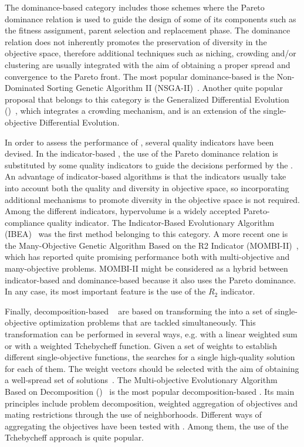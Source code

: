 The dominance-based category includes those schemes where the Pareto dominance relation is used to guide the 
design of some of its components such as the fitness assignment, parent selection and replacement phase.
%
The dominance relation does not inherently promotes the preservation of diversity in the objective space, 
therefore additional techniques such as niching, crowding and/or clustering are usually integrated with the aim of 
obtaining a proper spread and convergence to the Pareto front.
%
The most popular dominance-based \MOEA{} is the Non-Dominated Sorting Genetic Algorithm II (NSGA-II)~\cite{Joel:NSGAII}. 
%
Another quite popular proposal that belongs to this category is the Generalized Differential Evolution (\GDEIII{})~\cite{Joel:GDE3}, 
which integrates a crowding mechanism, and is an extension of the single-objective Differential Evolution.

In order to assess the performance of \MOEAS{}, several quality indicators have been devised.
%
In the indicator-based \MOEAS{}, the use of the Pareto dominance relation is substituted by some quality indicators 
to guide the decisions performed by the \MOEA{}.
%
An advantage of indicator-based algorithms is that the indicators usually take into account both the quality and 
diversity in objective space, so incorporating additional mechanisms to promote diversity in the objective 
space is not required.
%
Among the different indicators, hypervolume is a widely accepted Pareto-compliance quality indicator.
%
The Indicator-Based Evolutionary Algorithm (IBEA)~\cite{Joel:IBEA} was the first method belonging to this category.
%
A more recent one is the Many-Objective Genetic Algorithm Based on the R2 Indicator (MOMBI-II)~\cite{Joel:MOMBI-II}, 
which has reported quite promising performance both with multi-objective and many-objective problems.
%
MOMBI-II might be considered as a hybrid between indicator-based and dominance-based because it also uses the 
Pareto dominance. 
%
In any case, its most important feature is the use of the $R_2$ indicator. %
%

Finally, decomposition-based \MOEAS{}~\cite{Joel:MOEAD_AMS} are based on transforming the \MOP{} into a set of 
single-objective optimization problems that are tackled simultaneously.
%
This transformation can be performed in several ways, e.g. with a linear weighted sum or with a weighted Tchebycheff function. 
%
Given a set of weights to establish different single-objective functions, the \MOEA{} searches for a single 
high-quality solution for each of them. 
%
The weight vectors should be selected with the aim of obtaining a well-spread set of solutions~\cite{Joel:Kalyanmoy}.
%
The Multi-objective Evolutionary Algorithm Based on Decomposition (\MOEAD{})~\cite{Joel:MOEAD} is the most popular 
decomposition-based \MOEA{}. 
%
Its main principles include problem decomposition, weighted aggregation of objectives and mating restrictions 
through the use of neighborhoods. 
%
Different ways of aggregating the objectives have been tested with \MOEAD{}.
%
Among them, the use of the Tchebycheff approach is quite popular. 
%
 
